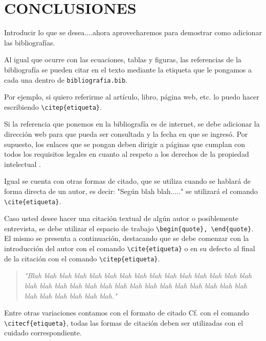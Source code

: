 
\newpage
{} 

%
%

\section*{CONCLUSIONES}
Introducir lo que se desea....ahora aprovecharemos para demostrar como adicionar las bibliografías. 

Al igual que ocurre con las ecuaciones, tablas y figuras, las referencias de la bibliografía se pueden citar en el texto mediante la etiqueta que le pongamos a cada una dentro de \verb|bibliografia.bib|.

Por ejemplo, si quiero referirme al artículo, libro, página web, etc. lo puedo hacer escribiendo \verb|\citep{etiqueta}|.

Si la referencia que ponemos en la bibliografía es de internet, se debe adicionar la dirección web para que pueda ser consultada y la fecha en que se ingresó. Por supuesto, los enlaces que se pongan deben dirigir a páginas que cumplan con todos los requisitos legales en cuanto al respeto a los derechos de la propiedad intelectual \citep{pressman1988ingenieria}.

Igual se cuenta con otras formas de citado, que se utiliza cuando se hablará de forma directa de un autor, es decir: "Según \cite{AI} blah blah....." se utilizará el comando \verb|\cite{etiqueta}|. 

Caso usted desee hacer una citación textual de algún autor o posiblemente entrevista, se debe utilizar el espacio de trabajo \verb|\begin{quote}, \end{quote}|. El mismo se presenta a continuación, destacando que se debe comenzar con la introducción del autor con el comando \verb|\cite{etiqueta}| o en su defecto al final de la citación con el comando \verb|\citep{etiqueta}|.

\begin{quote}
\singlespacing
\textit{"Blah blah blah blah blah blah blah blah blah blah blah blah blah blah blah blah blah blah blah blah blah blah blah blah blah blah blah blah blah blah blah blah blah blah blah blah."}    
\end{quote}

Entre otras variaciones contamos con el formato de citado Cf. con el comando \verb|\citecf{etiqueta}|, todas las formas de citación deben ser utilizadas con el cuidado correspondiente. 

